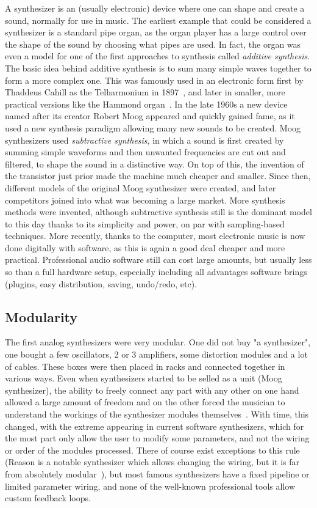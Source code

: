 \documentclass[11pt,a4paper]{article}
\begin{document}
A synthesizer is an (usually electronic) device where one can shape and create a sound, normally for use in music. The earliest example that could be considered a synthesizer is a standard pipe organ, as the organ player has a large control over the shape of the sound by choosing what pipes are used. In fact, the organ was even a model for one of the first approaches to synthesis called \emph{additive synthesis}. The basic idea behind additive synthesis is to sum many simple waves together to form a more complex one. This was famously used in an electronic form first by Thaddeus Cahill as the Telharmonium in 1897~\cite{Telharmonium}, and later in smaller, more practical versions like the Hammond organ~\cite{Hammond}.
In the late 1960s a new device named after its creator Robert Moog appeared and quickly gained fame, as it used a new synthesis paradigm allowing many new sounds to be created. Moog synthesizers used \emph{subtractive synthesis}, in which a sound is first created by summing simple waveforms and then unwanted frequencies are cut out and filtered, to shape the sound in a distinctive way. On top of this, the invention of the transistor just prior made the machine much cheaper and smaller. Since then, different models of the original Moog synthesizer were created, and later competitors joined into what was becoming a large market. More synthesis methods were invented, although subtractive synthesis still is the dominant model to this day thanks to its simplicity and power, on par with sampling-based techniques. More recently, thanks to the computer, most electronic music is now done digitally with software, as this is again a good deal cheaper and more practical. Professional audio software still can cost large amounts, but usually less so than a full hardware setup, especially including all advantages software brings (plugins, easy distribution, saving, undo/redo, etc).

\subsection{Modularity}

The first analog synthesizers were very modular. One did not buy "a synthesizer", one bought a few oscillators, 2 or 3 amplifiers, some distortion modules and a lot of cables. These boxes were then placed in racks and connected together in various ways. Even when synthesizers started to be selled as a unit (Moog synthesizer), the ability to freely connect any part with any other on one hand allowed a large amount of freedom and on the other forced the musician to understand the workings of the synthesizer modules themselves~\cite{ModularMoog}. With time, this changed, with the extreme appearing in current software synthesizers, which for the most part only allow the user to modify some parameters, and not the wiring or order of the modules processed. There of course exist exceptions to this rule (Reason is a notable synthesizer which allows changing the wiring, but it is far from absolutely modular~\cite{Reason}), but most famous synthesizers have a fixed pipeline or limited parameter wiring, and none of the well-known professional tools allow custom feedback loops.
\end{document}
